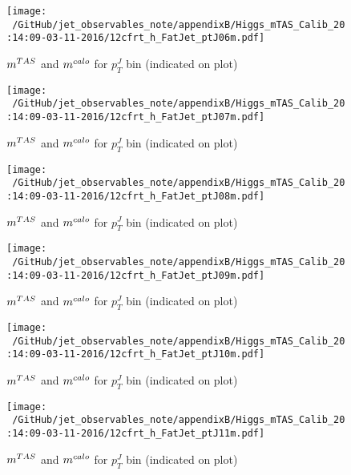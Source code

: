 \begin{figure}
 
\texttt{[image: ~/GitHub/jet\_observables\_note/appendixB/Higgs\_mTAS\_Calib\_20:14:09-03-11-2016/12cfrt\_h\_FatJet\_ptJ06m.pdf]}
\caption{$m^{TAS}$ and $m^{calo}$ for $p_{T}^{J}$ bin (indicated on plot) }
 
\end{figure}
\begin{figure}
 
\texttt{[image: ~/GitHub/jet\_observables\_note/appendixB/Higgs\_mTAS\_Calib\_20:14:09-03-11-2016/12cfrt\_h\_FatJet\_ptJ07m.pdf]}
\caption{$m^{TAS}$ and $m^{calo}$ for $p_{T}^{J}$ bin (indicated on plot) }
 
\end{figure}
 
\begin{figure}
 
\texttt{[image: ~/GitHub/jet\_observables\_note/appendixB/Higgs\_mTAS\_Calib\_20:14:09-03-11-2016/12cfrt\_h\_FatJet\_ptJ08m.pdf]}
\caption{$m^{TAS}$ and $m^{calo}$ for $p_{T}^{J}$ bin (indicated on plot) }
 
\end{figure}
 
\begin{figure}
 
\texttt{[image: ~/GitHub/jet\_observables\_note/appendixB/Higgs\_mTAS\_Calib\_20:14:09-03-11-2016/12cfrt\_h\_FatJet\_ptJ09m.pdf]}
\caption{$m^{TAS}$ and $m^{calo}$ for $p_{T}^{J}$ bin (indicated on plot) }
 
\end{figure}
 
\begin{figure}
 
\texttt{[image: ~/GitHub/jet\_observables\_note/appendixB/Higgs\_mTAS\_Calib\_20:14:09-03-11-2016/12cfrt\_h\_FatJet\_ptJ10m.pdf]}
\caption{$m^{TAS}$ and $m^{calo}$ for $p_{T}^{J}$ bin (indicated on plot) }
 
\end{figure}
 
\begin{figure}
 
\texttt{[image: ~/GitHub/jet\_observables\_note/appendixB/Higgs\_mTAS\_Calib\_20:14:09-03-11-2016/12cfrt\_h\_FatJet\_ptJ11m.pdf]}
\caption{$m^{TAS}$ and $m^{calo}$ for $p_{T}^{J}$ bin (indicated on plot) }
 
\end{figure}
 

